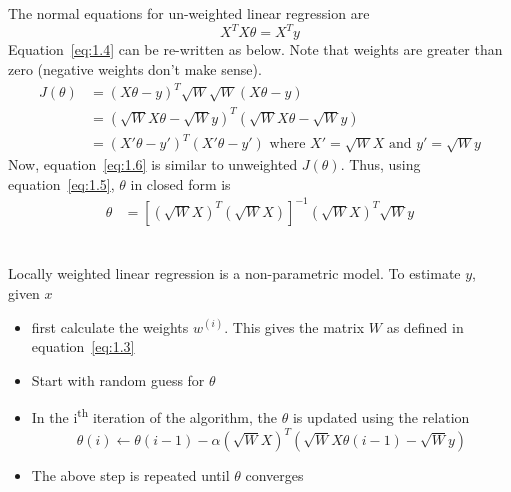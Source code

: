 \documentclass{article}
\begin{document}
\subsection{}
The normal equations for un-weighted linear regression are
\begin{equation}
  \label{eq:1.5}
  X^T X \theta = X^T y
\end{equation}
Equation~\ref{eq:1.4} can be re-written as below. Note that 
weights are greater than zero (negative weights don't make sense).
\begin{equation}
  \label{eq:1.6}
  \begin{split}
    J(\theta) &= (X\theta - y)^T \sqrt{W}\sqrt{W} (X\theta - y)     \\
    &= (\sqrt{W}X\theta - \sqrt{W}y)^T (\sqrt{W}X\theta - \sqrt{W}y) \\
    &= (X'\theta - y')^T(X'\theta - y') \text{ where } X' = \sqrt{W}X \text{ and } y' = \sqrt{W}y
  \end{split}
\end{equation}
Now, equation~\ref{eq:1.6} is similar to unweighted $J(\theta)$. Thus, using equation~\ref{eq:1.5}, $\theta$ in closed form is
\begin{equation}
  \label{eq:1.7}
  \begin{split}
    \theta &= \left[(\sqrt{W}X)^T(\sqrt{W}X)\right]^{-1} \left(\sqrt{W}X\right)^T \sqrt{W}y \\
  \end{split}
\end{equation}

\subsection{}
Locally weighted linear regression is a non-parametric model.
To estimate $y$, given $x$

\begin{itemize}
\item first calculate the weights $w^{(i)}$. This gives the matrix $W$ as defined in equation~\ref{eq:1.3}
\item Start with random guess for $\theta$
  \item In the i\textsuperscript{th} iteration of the algorithm, the $\theta$ is updated using the relation
    \begin{equation}
      \label{eq:1.8}
      \theta(i) \leftarrow \theta(i-1) - \alpha \left(\sqrt{W}X\right)^T \left(\sqrt{W}X\theta(i-1) - \sqrt{W}y\right)
    \end{equation}
\item The above step is repeated until $\theta$ converges
\end{itemize}
\end{document}
